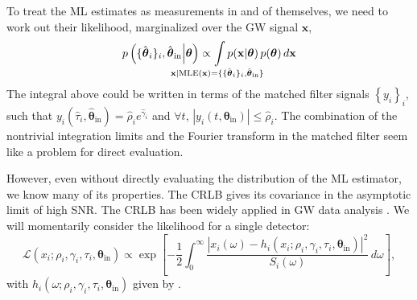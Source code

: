 \documentclass{iopart}
\def\clap#1{\hbox to 0pt{\hss#1\hss}}
\def\mathclap{\mathpalette\mathclapinternal}
\def\mathclapinternal#1#2{\clap{$\mathsurround=0pt#1{#2}$}}
\begin{document}
To treat the ML estimates as measurements in and of themselves, we need to work out their likelihood, marginalized over the GW signal $\mathbf{x}$,
%
\begin{equation}\label{eq:detection-candidate-likelihood}
	p\left(\{\hat{\boldsymbol\theta}_i\}_i,
		\hat{\boldsymbol\theta}_\mathrm{in}
	\middle| \boldsymbol\theta\right)
	\propto \int\limits_{\mathclap{\mathbf{x} | \mathrm{MLE}(\mathbf{x}) =
		\{\{\hat{\boldsymbol\theta}_i\}_i,
		\hat{\boldsymbol\theta}_\mathrm{in}\}}}
	p(\mathbf{x} | \boldsymbol\theta) \, p(\boldsymbol\theta)
	\, d\mathbf{x}
\end{equation}
%
The integral above could be written in terms of the matched filter signals $\left\{y_i\right\}_i$, such that $y_i\left(\hat\tau_i, \hat{\boldsymbol\theta}_\mathrm{in}\right) = \hat\rho_i e^{\hat\gamma_i}$ and $\forall t$, $\left|y_i(t, \boldsymbol\theta_\mathrm{in})\right| \leq \hat\rho_i$. The combination of the nontrivial integration limits and the Fourier transform in the matched filter seem like a problem for direct evaluation.

However, even without directly evaluating the distribution of the \ac{ML} estimator, we know many of its properties. The \ac{CRLB} gives its covariance in the asymptotic limit of high \ac{SNR}. The \ac{CRLB} has been widely applied in \ac{GW} data analysis \cite{fairhurst:2009}. We will momentarily consider the likelihood for a single detector:
%
\begin{equation}\label{eq:gaussian-likelihood-spa}
	\mathcal{L}\left(x_i; \rho_i, \gamma_i, \tau_i,
		\boldsymbol\theta_\mathrm{in}\right)
	\propto \exp \left[
		- \frac{1}{2} \int_0^\infty \frac{\left|x_i (\omega)
			- h_i\left(x_i; \rho_i, \gamma_i, \tau_i,
				\boldsymbol\theta_\mathrm{in}\right)
		\right|^2}{S_i(\omega)} \, d\omega
	\right],
\end{equation}
%
with $h_i(\omega; \rho_i, \gamma_i, \tau_i, \boldsymbol\theta_\mathrm{in})$ given by .
\end{document}
